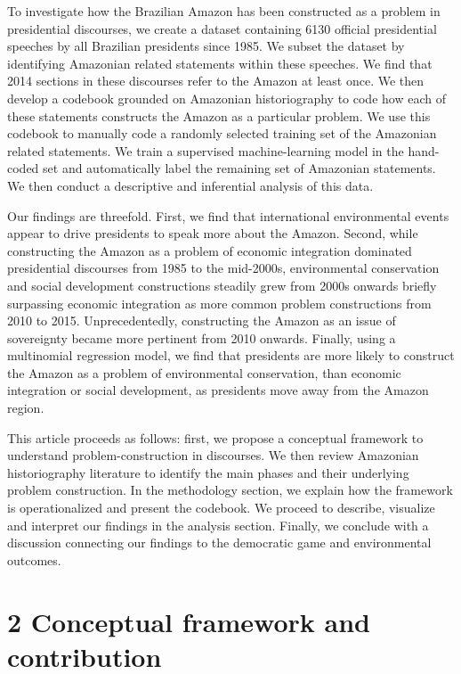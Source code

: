 \documentclass[
]{article}
\begin{document}
To investigate how the Brazilian Amazon has been constructed as a
problem in presidential discourses, we create a dataset containing 6130
official presidential speeches by all Brazilian presidents since 1985.
We subset the dataset by identifying Amazonian related statements within
these speeches. We find that 2014 sections in these discourses refer to
the Amazon at least once. We then develop a codebook grounded on
Amazonian historiography to code how each of these statements constructs
the Amazon as a particular problem. We use this codebook to manually
code a randomly selected training set of the Amazonian related
statements. We train a supervised machine-learning model in the
hand-coded set and automatically label the remaining set of Amazonian
statements. We then conduct a descriptive and inferential analysis of
this data.

Our findings are threefold. First, we find that international
environmental events appear to drive presidents to speak more about the
Amazon. Second, while constructing the Amazon as a problem of economic
integration dominated presidential discourses from 1985 to the
mid-2000s, environmental conservation and social development
constructions steadily grew from 2000s onwards briefly surpassing
economic integration as more common problem constructions from 2010 to
2015. Unprecedentedly, constructing the Amazon as an issue of
sovereignty became more pertinent from 2010 onwards. Finally, using a
multinomial regression model, we find that presidents are more likely to
construct the Amazon as a problem of environmental conservation, than
economic integration or social development, as presidents move away from
the Amazon region.

This article proceeds as follows: first, we propose a conceptual
framework to understand problem-construction in discourses. We then
review Amazonian historiography literature to identify the main phases
and their underlying problem construction. In the methodology section,
we explain how the framework is operationalized and present the
codebook. We proceed to describe, visualize and interpret our findings
in the analysis section. Finally, we conclude with a discussion
connecting our findings to the democratic game and environmental
outcomes.

\hypertarget{conceptual-framework-and-contribution}{%
\section{2 Conceptual framework and
contribution}\label{conceptual-framework-and-contribution}}
\end{document}

